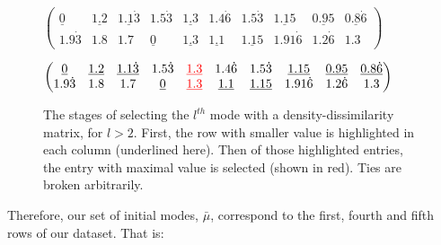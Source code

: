 \begin{example}
\begin{figure}[H]
{        \vspace{10pt}

        \begin{minipage}{\textwidth}
            \centering
            \(
            \begin{pmatrix}
                \underline{0} & \underline{1.2} &
                \underline{1.1\dot{3}} & 1.5\dot{3} & \underline{1.3}
                & 1.4\dot{6} & 1.5\dot{3} & \underline{1.15} &
                \underline{0.95} & \underline{0.8\dot{6}}
                \\
                1.9\dot{3} & 1.8 & 1.7 & \underline{0} &
                \underline{1.3} & \underline{1.1} &
                \underline{1.15} & 1.91\dot{6} & 1.2\dot{6} & 1.3
            \end{pmatrix}
            \)
        \end{minipage}

        \vspace{10pt}

        \begin{minipage}{\textwidth}
            \centering
            \(
            \begin{pmatrix}
                \underline{0} & \underline{1.2} & \underline{1.1\dot{3}} &
                1.5\dot{3} & \textcolor{red}{\underline{1.3}} & 1.4\dot{6} &
                1.5\dot{3} & \underline{1.15} & \underline{0.95} &
                \underline{0.8\dot{6}}
                \\
                1.9\dot{3} & 1.8 & 1.7 & \underline{0} &
                \textcolor{red}{\underline{1.3}} & \underline{1.1} &
                \underline{1.15} & 1.91\dot{6} & 1.2\dot{6} & 1.3
            \end{pmatrix}
            \)
        \end{minipage}
        }
        \caption{The stages of selecting the \(l^{th}\) mode with a
        density-dissimilarity matrix, for \(l > 2\). First, the row with smaller
        value is highlighted in each column (underlined here). Then of those
        highlighted entries, the entry with maximal value is selected (shown in
    red). Ties are broken arbitrarily.}\label{fig:cao-matrix}
    \end{figure}

    Therefore, our set of initial modes, \(\bar{\mu}\), correspond to the first,
    fourth and fifth rows of our dataset. That is:
    
    
\end{example}
